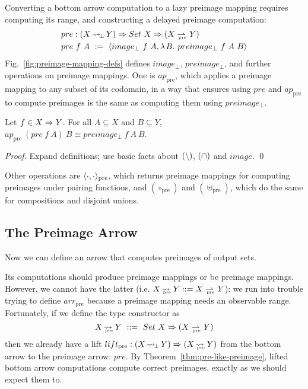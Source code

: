 \documentclass{llncs}
\newcommand{\figref}[1]{Fig.~\ref{#1}}
\newcommand{\arrow}{\rightsquigarrow}
\newcommand{\pto}{\rightharpoonup}
\newcommand{\arrowlift}{\ensuremath{lift}}
\newcommand{\arrowarr}{\ensuremath{arr}}
\DeclareMathOperator{\botto}{\arrow_{\mspace{-3mu}\bot}}
\newcommand{\pre}{_\mathrm{pre}}
\DeclareMathOperator{\preto}{\arrow_{\mspace{-19mu}\pre}}
\newcommand{\liftpre}{\arrowlift\pre}
\newcommand{\arrpre}{\arrowarr\pre}
\newcommand{\prepto}{\pto_{\mspace{-19mu}\pre}}
\begin{document}
Converting a bottom arrow computation to a lazy preimage mapping requires computing its range, and constructing a delayed preimage computation:
\begin{equation}
\begin{aligned}
	&pre : (X \botto Y) \tto Set~X \tto (X \prepto Y) \\
	&pre~f~A \ := \ \pair{image_\bot~f~A,\fun{B}{preimage_\bot~f~A~B}}
\end{aligned}
\end{equation}
\figref{fig:preimage-mapping-defs} defines $image_\bot$, $preimage_\bot$, and further operations on preimage mappings.
One is $ap\pre$, which applies a preimage mapping to any subset of its codomain, in a way that ensures using $pre$ and $ap\pre$ to compute preimages is the same as computing them using $preimage_\bot$.

\begin{theorem}[$ap\pre$ computes preimages]
\label{thm:pre-like-preimage}
Let $f \in X \Rightarrow Y$. For all $A \subseteq X$ and $B \subseteq Y$, $ap\pre~(pre~f~A)~B \equiv preimage_\bot~f~A~B$.
\end{theorem}
\begin{proof}
Expand definitions; use basic facts about $(\backslash)$, $(\cap)$ and $image$.
\qed
\end{proof}

Other operations are $\pair{\cdot,\cdot}\pre$, which returns preimage mappings for computing preimages under pairing functions, and $(\circ\pre)$ and $(\uplus\pre)$, which do the same for compositions and disjoint unions.

\subsection{The Preimage Arrow}
\label{sec:preimage-arrow}

Now we can define an arrow that computes preimages of output sets.

Its computations should produce preimage mappings or be preimage mappings.
However, we cannot have the latter (i.e. $X \preto Y ::= X \prepto Y$): we run into trouble trying to define $\arrpre$ because a preimage mapping needs an observable range.
Fortunately, if we define the  type constructor as
\begin{equation}
	X \preto Y \ ::= \ Set~X \tto (X \prepto Y)
\end{equation}
then we already have a lift $\liftpre : (X \botto Y) \tto (X \preto Y)$ from the bottom arrow to the preimage arrow: $pre$.
By Theorem~\ref{thm:pre-like-preimage}, lifted bottom arrow computations compute correct preimages, exactly as we should expect them to.
\end{document}
